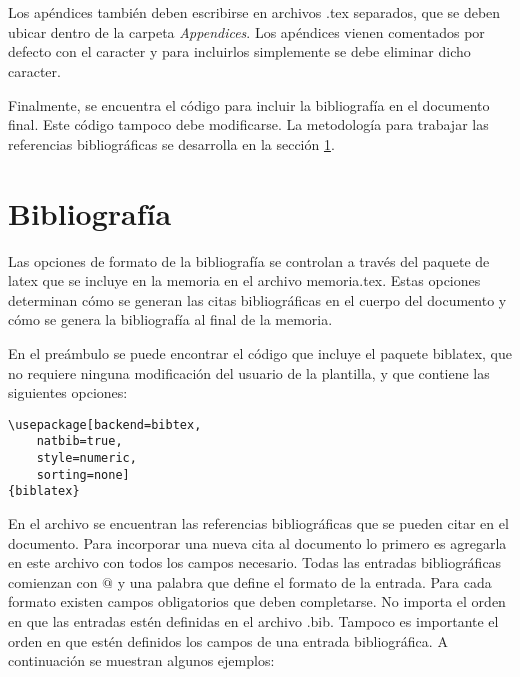 \begin{verbatim}
	
	 
	
	 
	 
\end{verbatim}

Los apéndices también deben escribirse en archivos .tex separados, que se deben ubicar dentro de la carpeta \emph{Appendices}. Los apéndices vienen comentados por defecto con el caracter \code{\%} y para incluirlos simplemente se debe eliminar dicho caracter.

Finalmente, se encuentra el código para incluir la bibliografía en el documento final.  Este código tampoco debe modificarse. La metodología para trabajar las referencias bibliográficas se desarrolla en la sección \ref{sec:biblio}.

\section{Bibliografía}
\label{sec:biblio}

Las opciones de formato de la bibliografía se controlan a través del paquete de latex  que se incluye en la memoria en el archivo memoria.tex.  Estas opciones determinan cómo se generan las citas bibliográficas en el cuerpo del documento y cómo se genera la bibliografía al final de la memoria.

En el preámbulo se puede encontrar el código que incluye el paquete biblatex, que no requiere ninguna modificación del usuario de la plantilla, y que contiene las siguientes opciones:

\begin{lstlisting}
\usepackage[backend=bibtex,
	natbib=true, 
	style=numeric, 
	sorting=none]
{biblatex}
\end{lstlisting}

En el archivo  se encuentran las referencias bibliográficas que se pueden citar en el documento.  Para incorporar una nueva cita al documento lo primero es agregarla en este archivo con todos los campos necesario.  Todas las entradas bibliográficas comienzan con $@$ y una palabra que define el formato de la entrada.  Para cada formato existen campos obligatorios que deben completarse. No importa el orden en que las entradas estén definidas en el archivo .bib.  Tampoco es importante el orden en que estén definidos los campos de una entrada bibliográfica. A continuación se muestran algunos ejemplos:

